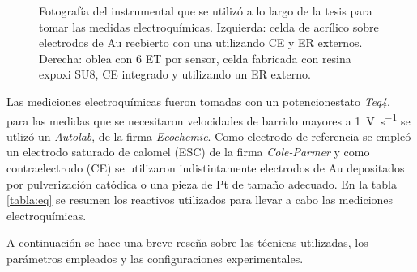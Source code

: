 \begin{figure}[b!]
\begin{subfigure}[t]{0.495\textwidth}
			  		  \end{subfigure}
			  \caption[Equipo para realizar la medidas electroquímicas]{Fotografía del instrumental que se utilizó a lo largo de la tesis para tomar las medidas electroquímicas. Izquierda: celda de acrílico sobre electrodos de Au recbierto con una \pdm\space utilizando CE y ER externos. Derecha: oblea con 6 ET por sensor, celda fabricada con resina expoxi SU8, CE integrado y utilizando un ER externo.}
			  		 \label{fig:celda}
			 		 \end{figure}	
					
			 		  
			Las mediciones electroquímicas fueron tomadas con un potencionestato \textit{Teq4}, para las medidas que se necesitaron velocidades de barrido mayores a \SI{1}{\volt\per\second} se utlizó un \textit{Autolab}, de la firma \textit{Ecochemie}. Como electrodo de referencia se empleó un electrodo saturado de calomel (ESC) de la firma \textit{Cole-Parmer} y como contraelectrodo (CE) se utilizaron indistintamente electrodos de Au depositados por pulverización catódica o una pieza de Pt de tamaño adecuado. En la tabla \ref{tabla:eq} se resumen los reactivos utilizados para llevar a cabo las mediciones electroquímicas. 
			
			A continuación se hace una breve reseña sobre las técnicas utilizadas, los parámetros empleados y las configuraciones experimentales.

